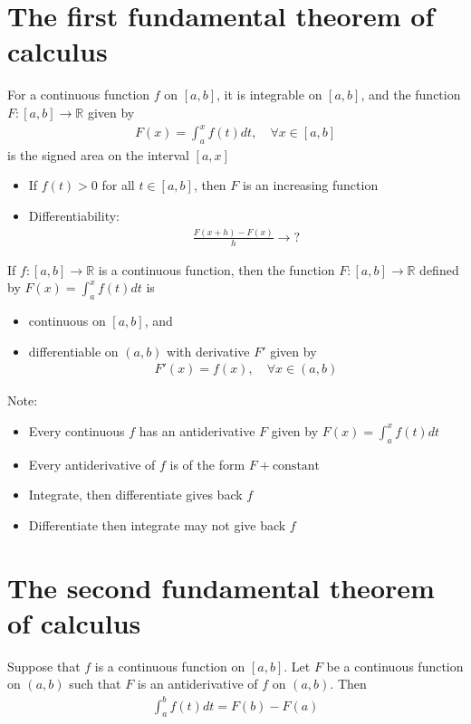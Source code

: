 \documentclass{report}
\begin{document}
	\section{The first fundamental theorem of calculus}

	For a continuous function $f$ on $[a,b]$, it is integrable on $[a,b]$, and the function $F:[a,b]\to \mathbb{R}$ given by
	\begin{align*}
		F(x) = \int_a^x f(t) dt, \quad \forall x \in [a,b]
	\end{align*}
	is the signed area on the interval $[a,x]$
	\begin{itemize}
		\item If $f(t) > 0$ for all $t \in [a,b]$, then $F$ is an increasing function
		\item Differentiability:
			\begin{align*}
				\frac{F(x + h) - F(x)}{h} \to ?
			\end{align*}
	\end{itemize}

	If $f:[a,b] \to \mathbb{R}$ is a continuous function, then the function $F:[a,b] \to \mathbb{R}$ defined by $F(x) = \displaystyle\int_a^x f(t) dt$ is
	\begin{itemize}
		\item continuous on $[a,b]$, and
		\item differentiable on $(a,b)$ with derivative $F'$ given by
			\begin{align*}
				F'(x) = f(x), \quad \forall x \in (a,b)
			\end{align*}
	\end{itemize}

	Note:
	\begin{itemize}
		\item Every continuous $f$ has an antiderivative $F$ given by $F(x) = \int_a^x f(t) dt$
		\item Every antiderivative of $f$ is of the form $F+\text{constant}$
		\item Integrate, then differentiate gives back $f$
		\item Differentiate then integrate may not give back $f$
	\end{itemize}

	\section{The second fundamental theorem of calculus}

	Suppose that $f$ is a continuous function on $[a,b]$. Let $F$ be a continuous function on $(a,b)$ such that $F$ is an antiderivative of $f$ on $(a,b)$. Then
	\begin{align*}
		\int_a^b f(t) dt = F(b) - F(a)
	\end{align*}
\end{document}
